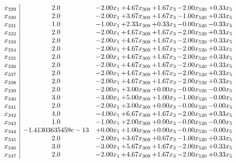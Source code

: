 \documentclass[8pt]{article}
\begin{document}
\[\begin{array}{c| c c@{\hskip 2pt} c@{\hskip 2pt} c@{\hskip 2pt} c@{\hskip 2pt} c@{\hskip 2pt} }
 x_{329}   &  2.0 & -2.00 x_{1} & +  4.67 x_{309} & +  1.67 x_{3} & -2.00 x_{520} & +  0.33 x_{5}\\
 x_{330}   &  2.0 & -2.00 x_{1} & +  3.67 x_{309} & +  1.67 x_{3} & -1.00 x_{520} & +  0.33 x_{5}\\
 x_{331}   &  1.0 & -1.00 x_{1} & +  2.33 x_{309} & +  0.33 x_{3} & -0.00 x_{520} & -0.33 x_{5}\\
 x_{332}   &  2.0 & -2.00 x_{1} & +  4.67 x_{309} & +  1.67 x_{3} & -2.00 x_{520} & +  0.33 x_{5}\\
 x_{333}   &  2.0 & -2.00 x_{1} & +  4.67 x_{309} & +  1.67 x_{3} & -2.00 x_{520} & +  0.33 x_{5}\\
 x_{334}   &  2.0 & -2.00 x_{1} & +  4.67 x_{309} & +  1.67 x_{3} & -2.00 x_{520} & +  0.33 x_{5}\\
 x_{335}   &  2.0 & -2.00 x_{1} & +  4.67 x_{309} & +  1.67 x_{3} & -2.00 x_{520} & +  0.33 x_{5}\\
 x_{336}   &  2.0 & -2.00 x_{1} & +  4.67 x_{309} & +  1.67 x_{3} & -2.00 x_{520} & +  0.33 x_{5}\\
 x_{337}   &  2.0 & -2.00 x_{1} & +  4.67 x_{309} & +  1.67 x_{3} & -2.00 x_{520} & +  0.33 x_{5}\\
 x_{338}   &  2.0 & -2.00 x_{1} & +  4.67 x_{309} & +  1.67 x_{3} & -2.00 x_{520} & +  0.33 x_{5}\\
 x_{339}   &  2.0 & -2.00 x_{1} & +  3.00 x_{309} & +  0.00 x_{3} & -0.00 x_{520} & -0.00 x_{5}\\
 x_{340}   &  3.0 & -3.00 x_{1} & +  5.00 x_{309} & +  1.00 x_{3} & -1.00 x_{520} & -0.00 x_{5}\\
 x_{341}   &  2.0 & -2.00 x_{1} & +  3.00 x_{309} & +  0.00 x_{3} & -0.00 x_{520} & -0.00 x_{5}\\
 x_{342}   &  4.0 & -4.00 x_{1} & +  6.67 x_{309} & +  1.67 x_{3} & -2.00 x_{520} & +  0.33 x_{5}\\
 x_{343}   &  1.0 & -1.00 x_{1} & +  2.00 x_{309} & +  0.00 x_{3} & -0.00 x_{520} & -0.00 x_{5}\\
 x_{344}   &  -1.41303635459e-13 & +  0.00 x_{1} & +  1.00 x_{309} & +  0.00 x_{3} & -0.00 x_{520} & -0.00 x_{5}\\
 x_{345}   &  2.0 & -2.00 x_{1} & +  3.67 x_{309} & +  0.67 x_{3} & -1.00 x_{520} & +  0.33 x_{5}\\
 x_{346}   &  3.0 & -3.00 x_{1} & +  5.67 x_{309} & +  1.67 x_{3} & -2.00 x_{520} & +  0.33 x_{5}\\
 x_{347}   &  2.0 & -2.00 x_{1} & +  4.67 x_{309} & +  1.67 x_{3} & -2.00 x_{520} & +  0.33 x_{5}\\

\end{array}\]
\end{document}
